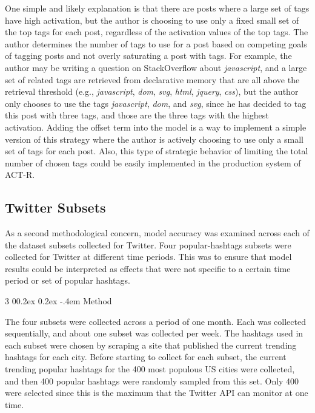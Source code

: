 \documentclass[man,floatsintext,donotrepeattitle]{apa6}
\makeatletter
\renewcommand{\subsubsection}{%
  \@startsection
  {subsubsection}%
  {3}%
  {\parindent}%
  {0\baselineskip \@plus 0.2ex \@minus 0.2ex}%
  {-.4em}%
  {\normalfont\normalsize\bfseries\addperi}}
\makeatother
\begin{document}
One simple and likely explanation is that there are posts where a large set of tags have high activation,
but the author is choosing to use only a fixed small set of the top tags for each post, regardless of the activation values of the top tags.
The author determines the number of tags to use for a post based on competing goals of tagging posts and not overly saturating a post with tags.
For example, the author may be writing a question on StackOverflow about \emph{javascript}, and a large set of related tags are retrieved from declarative memory that are all above the retrieval threshold
(e.g., \emph{javascript}, \emph{dom}, \emph{svg}, \emph{html}, \emph{jquery}, \emph{css}),
but the author only chooses to use the tags \emph{javascript}, \emph{dom}, and \emph{svg}, since he has decided to tag this post with three tags, and those are the three tags with the highest activation.
Adding the offset term into the model is a way to implement a simple version of this strategy where the author is actively choosing to use only a small set of tags for each post.
Also, this type of strategic behavior of limiting the total number of chosen tags could be easily implemented in the production system of ACT-R.

\subsection{Twitter Subsets}

As a second methodological concern, model accuracy was examined across each of the dataset subsets collected for Twitter.
Four popular-hashtags subsets were collected for Twitter at different time periods.
This was to ensure that model results could be interpreted as effects that were not specific to a certain time period or set of popular hashtags.

\subsubsection{Method}

The four subsets were collected across a period of one month.
Each was collected sequentially, and about one subset was collected per week.
The hashtags used in each subset were chosen by scraping a site that published the current trending hashtags for each city.
Before starting to collect for each subset, the current trending popular hashtags for the 400 most populous US cities were collected, and then 400 popular hashtags were randomly sampled from this set.
Only 400 were selected since this is the maximum that the Twitter API can monitor at one time.
\end{document}
